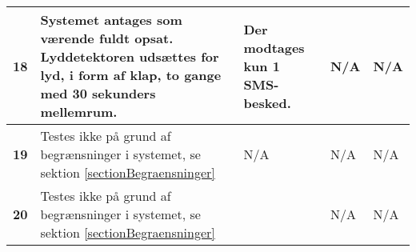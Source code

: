 \begin{center}
\begin{longtable}{|p{}|p{}|p{}|p{}|p{}|}
\textbf{18} &
Systemet antages som værende fuldt opsat.\newline
Lyddetektoren udsættes for lyd, i form af klap, to gange med 30 sekunders mellemrum.&
Der modtages kun 1 SMS-besked.&
N/A &
N/A \\\hline

\textbf{19} &
Testes ikke på grund af begrænsninger i systemet, se sektion \ref{sectionBegraensninger}&
N/A &
N/A &
N/A \\\hline

\textbf{20} &
Testes ikke på grund af begrænsninger i systemet, se sektion \ref{sectionBegraensninger}&
&
N/A &
N/A \\\hline



	\end{longtable}
	\label{IKFUNK} 
\end{center}